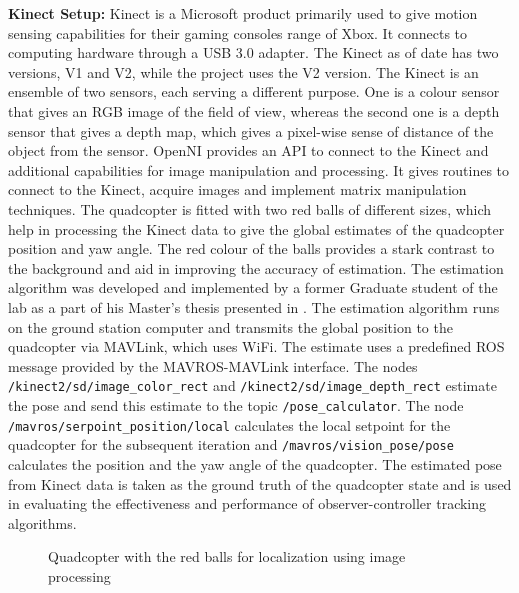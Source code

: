 \documentclass[letterpaper%
, twoside%
, 12pt%
,memoire%
, english%
,creativecommons,hyperref%
]{thETS}
\theoremstyle{newThmStyle}
\begin{document}


\textbf{Kinect Setup:} Kinect is a Microsoft product primarily used to give motion sensing capabilities for their gaming consoles range of Xbox. It connects to computing hardware through a USB 3.0 adapter. The Kinect as of date has two versions, V1 and V2, while the project uses the V2 version. The Kinect is an ensemble of two sensors, each serving a different purpose. One is a colour sensor that gives an RGB image of the field of view, whereas the second one is a depth sensor that gives a depth map, which gives a pixel-wise sense of distance of the object from the sensor. OpenNI provides an API to connect to the Kinect and additional capabilities for image manipulation and processing. It gives routines to connect to the Kinect, acquire images and implement matrix manipulation techniques. The quadcopter is fitted with two red balls of different sizes, which help in processing the Kinect data to give the global estimates of the quadcopter position and yaw angle. The red colour of the balls provides a stark contrast to the background and aid in improving the accuracy of estimation.
The estimation algorithm was developed and implemented by a former Graduate student of the lab as a part of his Master's thesis presented in \citep{brice2017thesis}. The estimation algorithm runs on the ground station computer and transmits the global position to the quadcopter via MAVLink, which uses WiFi. The estimate uses a predefined ROS message provided by the MAVROS-MAVLink interface. The nodes \texttt{/kinect2/sd/image\_color\_rect} and \texttt{/kinect2/sd/image\_depth\_rect} estimate the pose and send this estimate to the topic \texttt{/pose\_calculator}. The node \texttt{/mavros/serpoint\_position/local} calculates the local setpoint for the quadcopter for the subsequent iteration and \texttt{/mavros/vision\_pose/pose} calculates the position and the yaw angle of the quadcopter. The estimated pose from Kinect data is taken as the ground truth of the quadcopter state and is used in evaluating the effectiveness and performance of observer-controller tracking algorithms.

\begin{figure}
	\centering
	\parbox{0.75\textwidth}{\caption{Quadcopter with the red balls for localization using image processing\label{Fig:quad_red_balls}}}
\end{figure}
\end{document}
